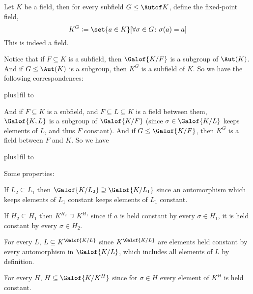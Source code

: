 \bdefn

    Let $K$ be a field, then for every subfield $G\leq\Autof K$, define the {\emphcolor fixed-point field},
    $$ K^G \coloneqq \set{a\in K}[\forall\sigma\in G\colon \sigma(a)=a] $$
    This is indeed a field.

\edefn

Notice that if $F\subseteq K$ is a subfield, then $\Galof{K/F}$ is a subgroup of $\Aut(K)$.
And if $G\leq\Aut(K)$ is a subgroup, then $K^G$ is a subfield of $K$.
So we have the following correspondences:

\medskip
{\tabskip=0pt plus1fil
\offinterlineskip\halign to}
\medskip

And if $F\subseteq K$ is a subfield, and $F\subseteq L\subseteq K$ is a field between them, $\Galof{K,L}$ is a subgroup of $\Galof{K/F}$ (since $\sigma\in\Galof{K/L}$ keeps elements of $L$, and thus $F$
constant).
And if $G\leq\Galof{K/F}$, then $K^G$ is a field between $F$ and $K$.
So we have

\medskip
{\tabskip=0pt plus1fil
\offinterlineskip\halign to}
\medskip

Some properties:
\benum
    \item If $L_2\subseteq L_1$ then $\Galof{K/L_2}\supseteq\Galof{K/L_1}$ since an automorphism which keeps elements of $L_1$ constant keeps elements of $L_1$ constant.
    \item If $H_2\subseteq H_1$ then $K^{H_2}\supseteq K^{H_1}$ since if $a$ is held constant by every $\sigma\in H_1$, it is held constant by every $\sigma\in H_2$.
    \item For every $L$, $L\subseteq K^{\Galof{K/L}}$ since $K^{\Galof{K/L}}$ are elements held constant by every automorphism in $\Galof{K/L}$, which includes all elements of $L$ by definition.
    \item For every $H$, $H\subseteq\Galof{K/K^H}$ since for $\sigma\in H$ every element of $K^H$ is held constant.
\eenum

\bye

